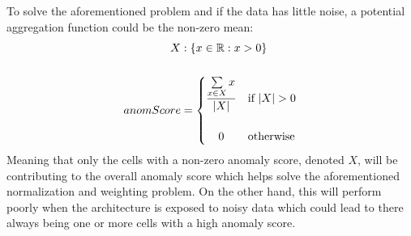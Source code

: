 To solve the aforementioned problem and if the data has little noise, a potential aggregation function could be the non-zero mean:
\begin{align*}
    X         & :\{x \in \mathbb{R} : x > 0\} \\
    \\
    anomScore & =
    \begin{cases}
        \dfrac{\sum\limits_{x \in X}x}{|X|} & \text{if } |X| > 0 \\
        \\
        \hfil 0                             & \text{otherwise}
    \end{cases}
\end{align*}
Meaning that only the cells with a non-zero anomaly score, denoted $X$, will be contributing to the overall anomaly score which helps solve the aforementioned normalization and weighting problem. On the other hand, this will perform poorly when the architecture is exposed to noisy data which could lead to there always being one or more cells with a high anomaly score.
